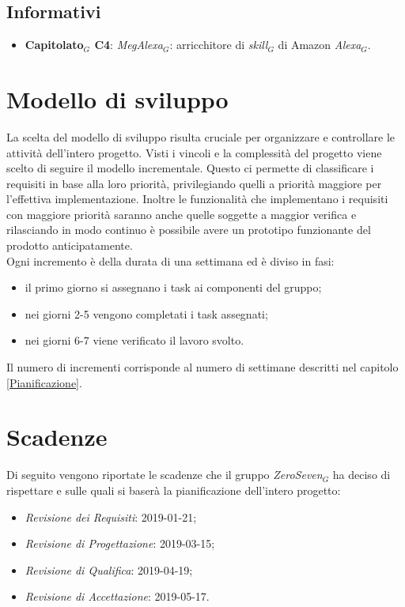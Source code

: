 \subsection{Informativi}
\begin{itemize}
	\item \textbf{Capitolato$_{G}$  C4}: \textit{MegAlexa$_{G}$}: arricchitore di \textit{skill$_{G}$} di Amazon \textit{Alexa$_{G}$}.
\end{itemize}
\section{Modello  di sviluppo}
\label{Modello di sviluppo}
La scelta del modello di sviluppo risulta cruciale per organizzare e controllare le attività dell'intero progetto. Visti i vincoli e la complessità del progetto viene scelto di seguire il modello incrementale. Questo ci permette di classificare i requisiti in base alla loro priorità, privilegiando quelli a priorità maggiore per l'effettiva implementazione. Inoltre le funzionalità che implementano i requisiti con maggiore priorità saranno anche quelle soggette a maggior verifica e rilasciando in modo continuo è possibile avere un prototipo funzionante del prodotto anticipatamente. \\
Ogni incremento è della durata di una settimana ed è diviso in fasi:
\begin{itemize}
	\item il primo giorno si assegnano i task ai componenti del gruppo;
	\item nei giorni 2-5 vengono completati i task assegnati;
	\item nei giorni 6-7 viene verificato il lavoro svolto.
\end{itemize}
Il numero di incrementi corrisponde al numero di settimane descritti nel capitolo \ref{Pianificazione}.
\section{Scadenze}
Di seguito vengono riportate le scadenze che il gruppo \textit{ZeroSeven$_{G}$} ha deciso di rispettare e sulle quali si baserà la pianificazione dell'intero progetto:
\begin{itemize}
	\item \textit{Revisione dei Requisiti}: 2019-01-21;
	\item \textit{Revisione di Progettazione}: 2019-03-15;
	\item \textit{Revisione di Qualifica}: 2019-04-19;
	\item \textit{Revisione di Accettazione}: 2019-05-17.
\end{itemize}